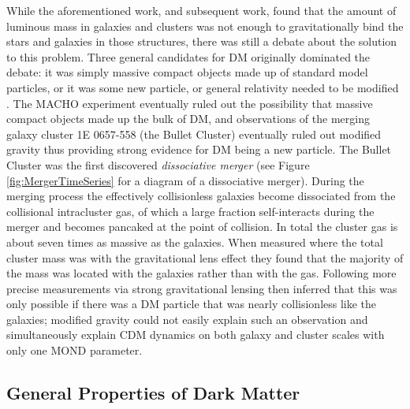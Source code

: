 While the aforementioned work, and subsequent work, found that the amount of luminous mass in galaxies and clusters was not enough to gravitationally bind the stars and galaxies in those structures, there was still a debate about the solution to this problem.
Three general candidates for DM originally dominated the debate:
it was simply massive compact objects made up of standard model particles, or it was some new particle, or general relativity needed to be modified \citep[see][for a review]{Sanders:2002cc}.
The MACHO experiment \citep{Alcock:2000bw} eventually ruled out the possibility that massive compact objects made up the bulk of DM, and observations of the merging galaxy cluster 1E 0657-558 (the Bullet Cluster) eventually ruled out modified gravity \citep{Clowe:2006hr} thus providing strong evidence for DM being a new particle. 
The Bullet Cluster was the first discovered \textit{dissociative merger} (see Figure \ref{fig:MergerTimeSeries} for a diagram of a dissociative merger).
During the merging process the effectively collisionless galaxies  become dissociated from the collisional intracluster gas, of which a large fraction self-interacts during the merger and becomes pancaked at the point of collision.
In total the cluster gas is about seven times as massive as the galaxies.
When \citet{Clowe:2004eq} measured where the total cluster mass was with the gravitational lens effect they found that the majority of the mass was located with the galaxies rather than with the gas.
Following more precise measurements via strong gravitational lensing \citet{Bradac:2006be} then inferred that this was only possible if there was a DM particle that was nearly collisionless like the galaxies; modified gravity could not easily explain such an observation and simultaneously explain CDM dynamics on both galaxy and cluster scales with only one MOND parameter.

\subsection{General Properties of Dark Matter}\label{section:CDMproperties}


